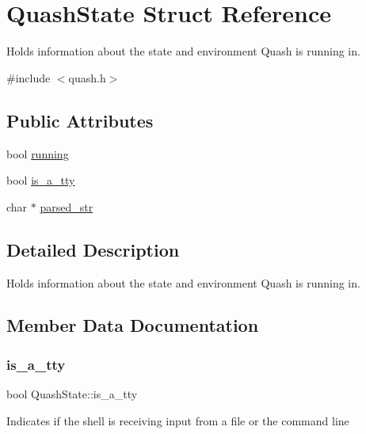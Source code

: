 \hypertarget{structQuashState}{}\section{Quash\+State Struct Reference}
\label{structQuashState}


Holds information about the state and environment Quash is running in.  




{\ttfamily \#include $<$quash.\+h$>$}

\subsection*{Public Attributes}
\begin{DoxyCompactItemize}
\item 
bool \hyperlink{structQuashState_a7db3a718696ee9d0c7f8b649ccb88bb4}{running}
\item 
bool \hyperlink{structQuashState_a6d92242ecd91c33779ea2deae58956bf}{is\+\_\+a\+\_\+tty}
\item 
char $\ast$ \hyperlink{structQuashState_a69d0ad3cb3bf44a92459020d98814f7e}{parsed\+\_\+str}
\end{DoxyCompactItemize}


\subsection{Detailed Description}
Holds information about the state and environment Quash is running in. 

\subsection{Member Data Documentation}
\mbox{\label{structQuashState_a6d92242ecd91c33779ea2deae58956bf}} 
\subsubsection{\texorpdfstring{is\+\_\+a\+\_\+tty}{is\_a\_tty}}
{\footnotesize\ttfamily bool Quash\+State\+::is\+\_\+a\+\_\+tty}

Indicates if the shell is receiving input from a file or the command line \mbox{\label{structQuashState_a69d0ad3cb3bf44a92459020d98814f7e}} 
